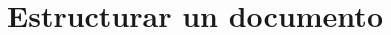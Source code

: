 \section{Estructurar un documento}

\begin{frame}
    \begin{columns}[t]
        \begin{column}{.5\textwidth}
          \tableofcontents[sections={1-2},currentsection]
        \end{column}
        \begin{column}{.5\textwidth}
          \tableofcontents[sections={3-4},currentsection]
        \end{column}
    \end{columns}
\end{frame}

\subsection{}
\begin{frame}[fragile]{}
\end{frame}
